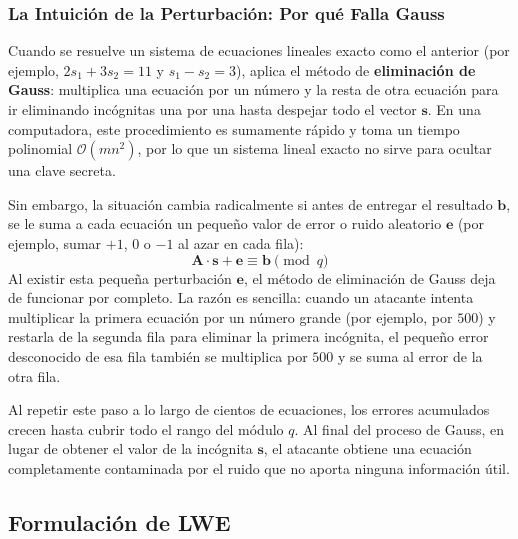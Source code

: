 \subsubsection{La Intuición de la Perturbación: Por qué Falla Gauss}

Cuando se resuelve un sistema de ecuaciones lineales exacto como el anterior (por ejemplo, $2s_1 + 3s_2 = 11$ y $s_1 - s_2 = 3$), aplica el método de \textbf{eliminación de Gauss}: multiplica una ecuación por un número y la resta de otra ecuación para ir eliminando incógnitas una por una hasta despejar todo el vector $\mathbf{s}$. En una computadora, este procedimiento es sumamente rápido y toma un tiempo polinomial $\mathcal{O}(m n^2)$, por lo que un sistema lineal exacto no sirve para ocultar una clave secreta.

Sin embargo, la situación cambia radicalmente si antes de entregar el resultado $\mathbf{b}$, se le suma a cada ecuación un pequeño valor de error o ruido aleatorio $\mathbf{e}$ (por ejemplo, sumar $+1$, $0$ o $-1$ al azar en cada fila):
\begin{equation}
	\mathbf{A} \cdot \mathbf{s} + \mathbf{e} \equiv \mathbf{b} \pmod q
\end{equation}
Al existir esta pequeña perturbación $\mathbf{e}$, el método de eliminación de Gauss deja de funcionar por completo. La razón es sencilla: cuando un atacante intenta multiplicar la primera ecuación por un número grande (por ejemplo, por $500$) y restarla de la segunda fila para eliminar la primera incógnita, el pequeño error desconocido de esa fila también se multiplica por $500$ y se suma al error de la otra fila.

Al repetir este paso a lo largo de cientos de ecuaciones, los errores acumulados crecen hasta cubrir todo el rango del módulo $q$. Al final del proceso de Gauss, en lugar de obtener el valor de la incógnita $\mathbf{s}$, el atacante obtiene una ecuación completamente contaminada por el ruido que no aporta ninguna información útil.

\subsection{Formulación de LWE}

